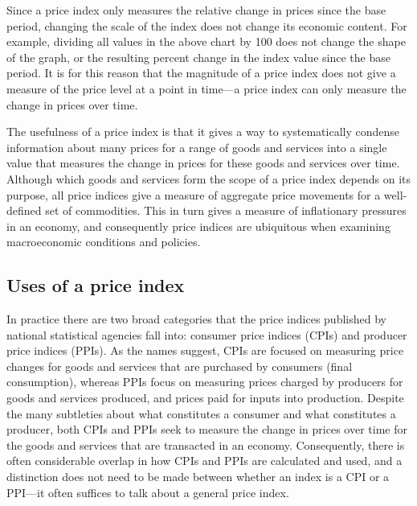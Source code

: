 \documentclass[]{article}
\begin{document}
Since a price index only measures the relative change in prices since the base period, changing the scale of the index does not change its economic content. For example, dividing all values in the above chart by 100 does not change the shape of the graph, or the resulting percent change in the index value since the base period. It is for this reason that the magnitude of a price index does not give a measure of the price level at a point in time---a price index can only measure the change in prices over time.

The usefulness of a price index is that it gives a way to systematically condense information about many prices for a range of goods and services into a single value that measures the change in prices for these goods and services over time. Although which goods and services form the scope of a price index depends on its purpose, all price indices give a measure of aggregate price movements for a well-defined set of commodities. This in turn gives a measure of inflationary pressures in an economy, and consequently price indices are ubiquitous when examining macroeconomic conditions and policies.

\hypertarget{uses-of-a-price-index}{%
\subsection{Uses of a price index}\label{uses-of-a-price-index}}

In practice there are two broad categories that the price indices published by national statistical agencies fall into: consumer price indices (CPIs) and producer price indices (PPIs). As the names suggest, CPIs are focused on measuring price changes for goods and services that are purchased by consumers (final consumption), whereas PPIs focus on measuring prices charged by producers for goods and services produced, and prices paid for inputs into production. Despite the many subtleties about what constitutes a consumer and what constitutes a producer, both CPIs and PPIs seek to measure the change in prices over time for the goods and services that are transacted in an economy. Consequently, there is often
considerable overlap in how CPIs and PPIs are calculated and used, and a distinction does not need to be made between whether an index is a CPI or a PPI---it often suffices to talk about a general price index.
\end{document}
